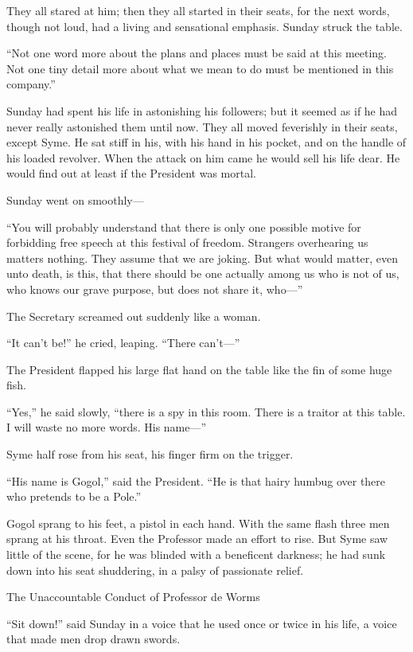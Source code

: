 They all stared at him; then they all started in their seats, for the next words, though not loud, had a living and sensational emphasis. Sunday struck the table.

“Not one word more about the plans and places must be said at this meeting. Not one tiny detail more about what we mean to do must be mentioned in this company.”

Sunday had spent his life in astonishing his followers; but it seemed as if he had never really astonished them until now. They all moved feverishly in their seats, except Syme. He sat stiff in his, with his hand in his pocket, and on the handle of his loaded revolver. When the attack on him came he would sell his life dear. He would find out at least if the President was mortal.

Sunday went on smoothly⁠—

“You will probably understand that there is only one possible motive for forbidding free speech at this festival of freedom. Strangers overhearing us matters nothing. They assume that we are joking. But what would matter, even unto death, is this, that there should be one actually among us who is not of us, who knows our grave purpose, but does not share it, who⁠—”

The Secretary screamed out suddenly like a woman.

“It can’t be!” he cried, leaping. “There can’t⁠—”

The President flapped his large flat hand on the table like the fin of some huge fish.

“Yes,” he said slowly, “there is a spy in this room. There is a traitor at this table. I will waste no more words. His name⁠—”

Syme half rose from his seat, his finger firm on the trigger.

“His name is Gogol,” said the President. “He is that hairy humbug over there who pretends to be a Pole.”

Gogol sprang to his feet, a pistol in each hand. With the same flash three men sprang at his throat. Even the Professor made an effort to rise. But Syme saw little of the scene, for he was blinded with a beneficent darkness; he had sunk down into his seat shuddering, in a palsy of passionate relief.

\chap The Unaccountable Conduct of Professor de Worms

“Sit down!” said Sunday in a voice that he used once or twice in his life, a voice that made men drop drawn swords.

